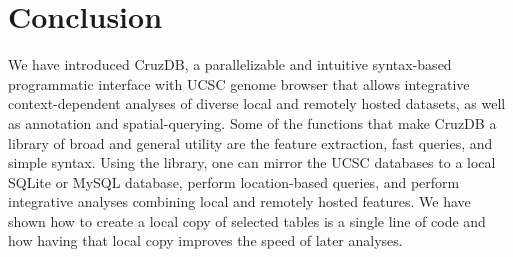 \documentclass{bioinfo}
\begin{document}
%
%



\section{Conclusion}
We have introduced CruzDB, a parallelizable and intuitive syntax-based programmatic interface with UCSC genome browser that allows integrative context-dependent analyses of diverse local and remotely hosted datasets, as well as annotation and spatial-querying. Some of the functions that make CruzDB a library of broad and general utility are the feature extraction, fast queries, and simple syntax.
Using the library, one can mirror the UCSC databases to a local SQLite or MySQL database, perform location-based queries, and perform integrative analyses combining local and remotely hosted features. We have shown how to create a local copy of selected tables is a single line of code and how having that local copy improves the speed of later analyses.






%
%
%
%
%
%
%
% 




  
\end{document}
